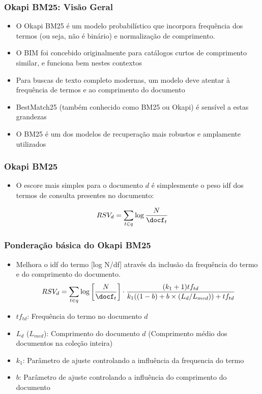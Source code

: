\documentclass[compress]{beamer}
\def\myblue#1{\textcolor{texblue}{#1}}
\begin{document}
\begin{frame}[<+->]
\frametitle{Okapi BM25: Visão Geral}
\pause[2]

\begin{itemize} 
\item O Okapi BM25 é um modelo probabilístico que incorpora frequência dos termos (ou seja, não é binário) e normalização de comprimento.
\item O BIM foi concebido originalmente para catálogos curtos de comprimento similar, e funciona bem nestes contextos

\item Para buscas de texto completo modernas, um modelo deve atentar à frequência de termos e ao comprimento do documento

\item  BestMatch25 (também conhecido como \myblue{BM25} ou \myblue{Okapi}) é sensível a estas  grandezas

\item O BM25 é um dos modelos de recuperação mais robustos e amplamente utilizados 
\end{itemize}
\end{frame}

\begin{frame}[<+->]
\frametitle{Okapi BM25}
\pause

\begin{itemize}
\item O escore mais simples para o documento $d$ é simplesmente o peso idf dos termos de consulta presentes no documento:
\end{itemize}
\pause
\begin{equation}
\nonumber
RSV_d = \sum_{t \in q} \log\frac{N}{\docf_t}
\end{equation}

\end{frame}

\begin{frame}[<+->]
\frametitle{Ponderação básica do Okapi BM25 }
\pause[2]

\begin{itemize}
\item Melhora o idf do termo [log N/df] através da inclusão da frequência do termo e do comprimento do documento.
\begin{equation}
\nonumber
RSV_d = \sum_{t \in q} \log\left[\frac{N}{\docf_t}\right]\cdot
\frac{(k_1 + 1)tf_{td}}
{k_1 ((1-b) + b\times (L_d/L_{med})) + tf_{td}} 
\end{equation}
\item $tf_{td}$: Frequência do termo no documento $d$
\item $L_d$ ($L_{med}$): Comprimento do documento $d$ (Comprimento médio dos 
documentos na coleção inteira)
\item $k_1$: Parâmetro de ajuste controlando a imfluência da frequencia do termo
\item $b$: Parâmetro de ajuste controlando a influência do comprimento do documento 
\end{itemize}
\end{frame}
\end{document}
